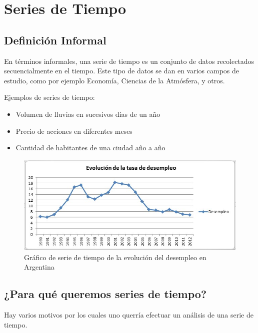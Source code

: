 \section{Series de Tiempo}


\theoremstyle{definition}
\newtheorem{definicion}{Definición}

\subsection*{Definición Informal}
En términos informales, una serie de tiempo es un conjunto de datos recolectados secuencialmente en el tiempo. Este tipo de datos se dan en varios campos de estudio, como por ejemplo Economía, Ciencias de la Atmósfera, y otros.

Ejemplos de series de tiempo:

\begin{itemize}
    \item Volumen de lluvias en sucesivos días de un año
    \item Precio de acciones en diferentes meses
    \item Cantidad de habitantes de una ciudad año a año
\end{itemize}

\begin{figure}
\centering
\includegraphics[width=15cm]{images/desocupacion.jpg}
\caption{Gráfico de serie de tiempo de la evolución del desempleo en Argentina \label{desocupacion}}
\end{figure}


\subsection*{¿Para qué queremos series de tiempo?}

Hay varios motivos por los cuales uno querría efectuar un análisis de una serie de tiempo.

